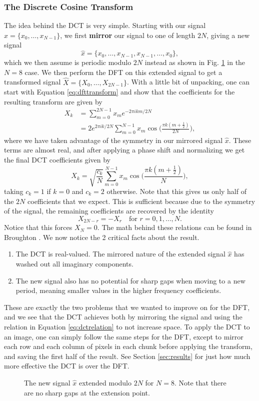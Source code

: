 \subsubsection{The Discrete Cosine Transform}
The idea behind the DCT is very simple. Starting with our signal $x=\{x_0,\dots,x_{N-1}\}$, we first \textbf{mirror} our signal to one of length $2N$, giving a new signal
\begin{equation}
    \hat{x}=\{x_0,\dots,x_{N-1},x_{N-1},\dots,x_0\},
    \label{eq:dctsig}
\end{equation}
which we then assume is periodic modulo $2N$ instead as shown in Fig. \ref{fig:dctextension} in the $N=8$ case. We then perform the DFT on this extended signal to get a transformed signal $\hat{X}=\{X_0,\dots,X_{2N-1}\}$. With a little bit of unpacking, one can start with Equation \ref{eq:dfttransform} and show that the coefficients for the resulting transform are given by
\begin{align}
    X_k&=\sum_{m=0}^{2N-1}x_me^{-2\pi ikm/2N}\label{eq:2ndft}\\
    &=2e^{2\pi ik/2N}\sum_{m=0}^{N-1}x_m\cos\bigg(\frac{\pi k(m+\tfrac{1}{2})}{2N}\bigg),\label{eq:predcttransform}
\end{align}
where we have taken advantage of the symmetry in our mirrored signal $\hat{x}$. These terms are almost real, and after applying a phase shift and normalizing we get the final DCT coefficients given by
\begin{equation}
    X_k=\sqrt{\frac{c_k}{N}}\sum_{m=0}^{N-1}x_m\cos\bigg(\frac{\pi k(m+\tfrac{1}{2})}{N}\bigg),\label{eq:dcttransform}
\end{equation}
taking $c_k=1$ if $k=0$ and $c_k=2$ otherwise. Note that this gives us only half of the $2N$ coefficients that we expect. This is sufficient because due to the symmetry of the signal, the remaining coefficients are recovered by the identity
\begin{equation}
    X_{2N-r}=-X_r\quad\text{for }r=0,1,\dots,N.\label{eq:dctrelation}
\end{equation}
Notice that this forces $X_N=0$. The math behind these relations can be found in Broughton \cite{broughton2009discrete}. We now notice the 2 critical facts about the result.
\begin{enumerate}
    \item The DCT is real-valued. The mirrored nature of the extended signal $\hat{x}$ has washed out all imaginary components.
    \item The new signal also has no potential for sharp gaps when moving to a new period, meaning smaller values in the higher frequency coefficients.
\end{enumerate}
These are exactly the two problems that we wanted to improve on for the DFT, and we see that the DCT achieves both by mirroring the signal and using the relation in Equation \ref{eq:dctrelation} to not increase space. To apply the DCT to an image, one can simply follow the same steps for the DFT, except to mirror each row and each column of pixels in each chunk before applying the transform, and saving the first half of the result. See Section \ref{sec:results} for just how much more effective the DCT is over the DFT.

\begin{figure}
    \centering
    
    \caption{The new signal $\hat{x}$ extended modulo $2N$ for $N=8$. Note that there are no sharp gaps at the extension point.}
    \label{fig:dctextension}
\end{figure}